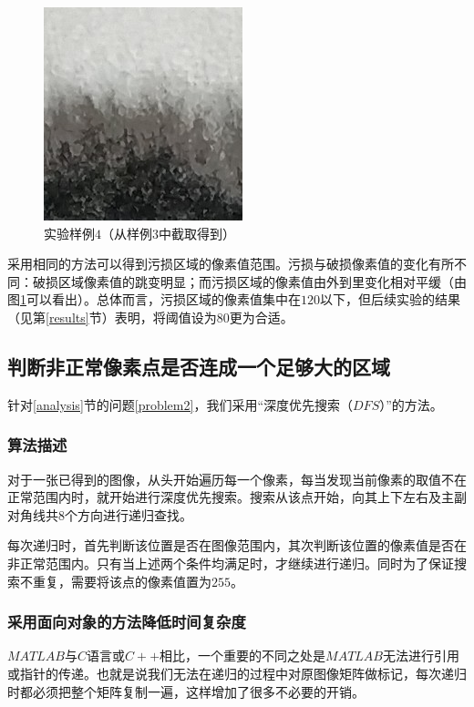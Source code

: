 \documentclass[UTF8]{ctexart}
\begin{document}
			\begin{figure}[H]
				\centering 
				\includegraphics[scale=1]{paper6.jpg} 
				\caption{实验样例$4$（从样例$3$中截取得到）} 
				\label{paper6}
			\end{figure}
		
			\indent 采用相同的方法可以得到污损区域的像素值范围。污损与破损像素值的变化有所不同：破损区域像素值的跳变明显；而污损区域的像素值由外到里变化相对平缓（由图\ref{paper6}可以看出）。总体而言，污损区域的像素值集中在$120$以下，但后续实验的结果（见第\ref{results}节）表明，将阈值设为$80$更为合适。
		\subsection{判断非正常像素点是否连成一个足够大的区域}
			
			\indent 针对\ref{analysis}节的问题\ref{problem2}，我们采用“深度优先搜索（$DFS$）”的方法。
			
			\subsubsection{算法描述}\label{algorithm}
			
				\indent 对于一张已得到的图像，从头开始遍历每一个像素，每当发现当前像素的取值不在正常范围内时，就开始进行深度优先搜索。搜索从该点开始，向其上下左右及主副对角线共$8$个方向进行递归查找。
				
				\indent 每次递归时，首先判断该位置是否在图像范围内，其次判断该位置的像素值是否在非正常范围内。只有当上述两个条件均满足时，才继续进行递归。同时为了保证搜索不重复，需要将该点的像素值置为$255$。
				
			\subsubsection{采用面向对象的方法降低时间复杂度}
			
				\indent $MATLAB$与$C$语言或$C++$相比，一个重要的不同之处是$MATLAB$无法进行引用或指针的传递。也就是说我们无法在递归的过程中对原图像矩阵做标记，每次递归时都必须把整个矩阵复制一遍，这样增加了很多不必要的开销。
				
\end{document}
